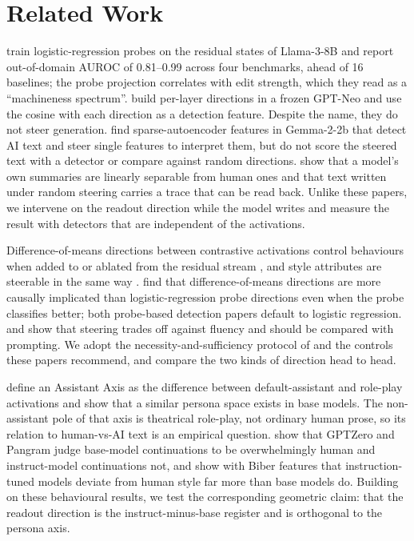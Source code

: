 \section{Related Work}
\label{sec:related}

\citet{quaremba2026linear} train logistic-regression probes on the residual states of Llama-3-8B and report out-of-domain AUROC of 0.81--0.99 across four benchmarks, ahead of 16 baselines; the probe projection correlates with edit strength, which they read as a ``machineness spectrum''.
\citet{vishnyakov2026svdetect} build per-layer directions in a frozen GPT-Neo and use the cosine with each direction as a detection feature. Despite the name, they do not steer generation.
\citet{kuznetsov2025sae} find sparse-autoencoder features in Gemma-2-2b that detect AI text and steer single features to interpret them, but do not score the steered text with a detector or compare against random directions.
\citet{ardoin2026self} show that a model's own summaries are linearly separable from human ones and that text written under random steering carries a trace that can be read back.
Unlike these papers, we intervene on the readout direction while the model writes and measure the result with detectors that are independent of the activations.

Difference-of-means directions between contrastive activations control behaviours when added to or ablated from the residual stream \citep{turner2023actadd,panickssery2023caa,arditi2024refusal,chen2025persona}, and style attributes are steerable in the same way \citep{konen2024style}.
\citet{marks2023geometry} find that difference-of-means directions are more causally implicated than logistic-regression probe directions even when the probe classifies better; both probe-based detection papers default to logistic regression.
\citet{tan2024reliability} and \citet{wu2025axbench} show that steering trades off against fluency and should be compared with prompting.
We adopt the necessity-and-sufficiency protocol of \citet{arditi2024refusal} and the controls these papers recommend, and compare the two kinds of direction head to head.

\citet{lu2026assistant} define an Assistant Axis as the difference between default-assistant and role-play activations and show that a similar persona space exists in base models.
The non-assistant pole of that axis is theatrical role-play, not ordinary human prose, so its relation to human-vs-AI text is an empirical question.
\citet{xu2026base} show that GPTZero and Pangram judge base-model continuations to be overwhelmingly human and instruct-model continuations not, and \citet{reinhart2024hape} show with Biber features that instruction-tuned models deviate from human style far more than base models do.
Building on these behavioural results, we test the corresponding geometric claim: that the readout direction is the instruct-minus-base register and is orthogonal to the persona axis.

